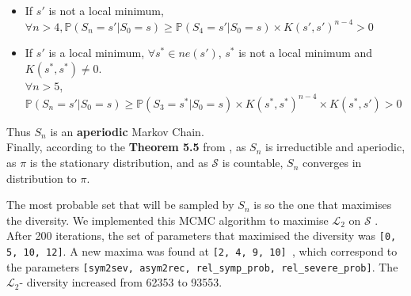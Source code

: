 \begin{itemize}
    \item If $s'$ is not a local minimum, \\
     $\forall n >4, \mathbb{P}(S_{n} = s' \vert S_0 = s) \geqslant \mathbb{P}(S_{4} = s' \vert S_0 = s) \times K(s', s')^{n-4} > 0 $ \\
    \item If $s'$ is a local minimum,  $\forall s^* \in ne(s')$, $s^*$ is not a local minimum and $K(s^*, s^*) \neq 0$. \\
    $\forall n>5$, $\mathbb{P}(S_n = s' \vert S_0 = s )   \geqslant \mathbb{P}(S_3=s^* \vert S_0 = s ) \times K(s^*, s^*)^{n-4} \times K(s^*, s') >0 $\\
    
\end{itemize}

Thus $S_n$ is an \textbf{aperiodic} Markov Chain.\\


Finally, according to the \textbf{Theorem 5.5 } from \cite*{bodineau2015modelisation}, as $S_n$ is irreductible and aperiodic, as $\pi$ is the stationary distribution, and as $\mathcal{S}$ is countable, $S_n$ converges in distribution to $\pi$.


The most probable set that will be sampled by $S_n$ is so the one that maximises the diversity.
We implemented this MCMC algorithm to maximise $\mathcal{L}_2$ on $\mathcal{S}$ . 
After 200 iterations, the set of parameters that maximised the diversity was \texttt{[0, 5, 10, 12]}. 
A new maxima was found at \texttt{[2, 4, 9, 10] }, which correspond to the parameters \texttt{[sym2sev, asym2rec, rel\_symp\_prob, rel\_severe\_prob]}. 
The $\mathcal{L}_2$- diversity increased from 62353 to 93553. \\

